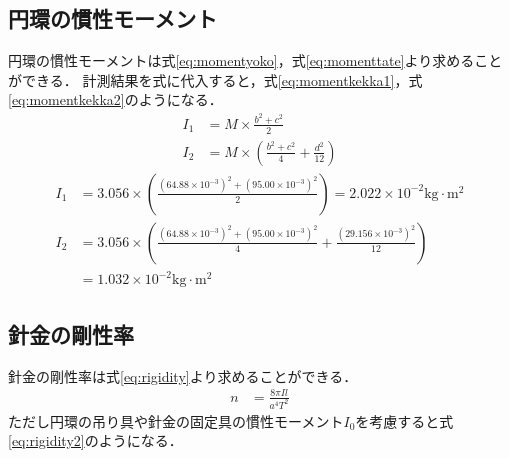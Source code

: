 \documentclass[a4paper,11pt]{ltjsarticle}
\begin{document}
\subsection{円環の慣性モーメント}
円環の慣性モーメントは式\eqref{eq:momentyoko}，式\eqref{eq:momenttate}より求めることができる．
計測結果を式に代入すると，式\eqref{eq:momentkekka1}，式\eqref{eq:momentkekka2}のようになる．
\begin{align}
  I_1 & = M \times \frac{b^2 + c^2}{2} \label{eq:momentyoko}                    \\
  I_2 & = M \times (\frac{b^2 + c^2}{4} + \frac{d^2}{12}) \label{eq:momenttate}
\end{align}
\begin{align}
  I_1 & = 3.056 \times (\frac{(64.88 \times 10^{-3})^2 + (95.00 \times 10^{-3})^2}{2}) = 2.022 \times 10^{-2} \mathrm{kg \cdot m^2}\label{eq:momentkekka1} \\
  I_2 & = 3.056 \times (\frac{(64.88 \times 10^{-3})^2 + (95.00 \times 10^{-3})^2}{4} + \frac{(29.156 \times 10^{-3})^2}{12})                              \\
      & = 1.032 \times 10^{-2} \mathrm{kg \cdot m^2}\label{eq:momentkekka2}
\end{align}
\subsection{針金の剛性率}
針金の剛性率は式\eqref{eq:rigidity}より求めることができる．
\begin{align}
  n & = \frac{8 \pi I l}{a^4 T^2} \label{eq:rigidity}
\end{align}
ただし円環の吊り具や針金の固定具の慣性モーメント$I_0$を考慮すると式\eqref{eq:rigidity2}のようになる．
\end{document}
